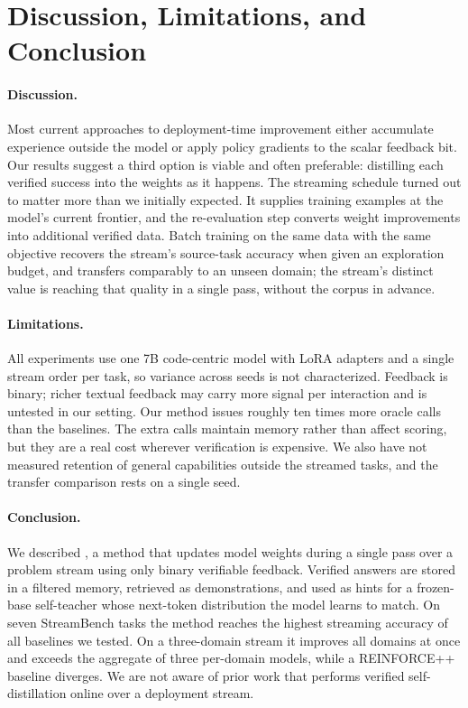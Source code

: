 \section{Discussion, Limitations, and Conclusion}
\label{sec:conclusion}

\paragraph{Discussion.} Most current approaches to deployment-time improvement
either accumulate experience outside the model or apply policy gradients to the
scalar feedback bit. Our results suggest a third option is viable and often
preferable: distilling each verified success into the weights as it happens.
The streaming schedule turned out to matter more than we initially expected.
It supplies training examples at the model's current frontier, and the
re-evaluation step converts weight improvements into additional verified data.
Batch training on the same data with the same objective recovers the
stream's source-task accuracy when given an exploration budget, and transfers
comparably to an unseen domain; the stream's distinct value is reaching that
quality in a single pass, without the corpus in advance.

\paragraph{Limitations.} All experiments use one 7B code-centric model with
LoRA adapters and a single stream order per task, so variance across seeds is
not characterized. Feedback is binary; richer textual feedback
\citep{hue2026sdpo} may carry more signal per interaction and is untested in
our setting. Our method issues roughly ten times more oracle calls than the
baselines. The extra calls maintain memory rather than affect scoring, but they
are a real cost wherever verification is expensive. We also have not measured
retention of general capabilities outside the streamed tasks, and the
transfer comparison rests on a single seed.

\paragraph{Conclusion.} We described \method{}, a method that updates model
weights during a single pass over a problem stream using only binary verifiable
feedback. Verified answers are stored in a filtered memory, retrieved as
demonstrations, and used as hints for a frozen-base self-teacher whose
next-token distribution the model learns to match. On seven StreamBench tasks
the method reaches the highest streaming accuracy of all baselines we tested.
On a three-domain stream it improves all domains at once and exceeds the
aggregate of three per-domain models, while a REINFORCE++ baseline diverges.
We are not aware of prior work that performs verified self-distillation online
over a deployment stream.

